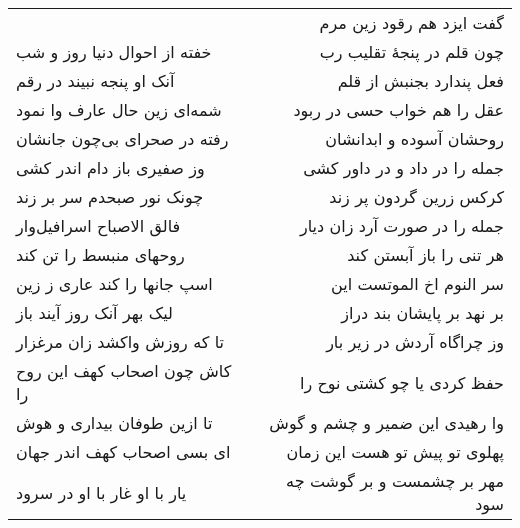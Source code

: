 \begin{center}
\begin{longtable}{l p{0.5cm} r}
&&
گفت ایزد هم رقود زین مرم
\\
خفته از احوال دنیا روز و شب
&&
چون قلم در پنجهٔ تقلیب رب
\\
آنک او پنجه نبیند در رقم
&&
فعل پندارد بجنبش از قلم
\\
شمه‌ای زین حال عارف وا نمود
&&
عقل را هم خواب حسی در ربود
\\
رفته در صحرای بی‌چون جانشان
&&
روحشان آسوده و ابدانشان
\\
وز صفیری باز دام اندر کشی
&&
جمله را در داد و در داور کشی
\\
چونک نور صبحدم سر بر زند
&&
کرکس زرین گردون پر زند
\\
فالق الاصباح اسرافیل‌وار
&&
جمله را در صورت آرد زان دیار
\\
روحهای منبسط را تن کند
&&
هر تنی را باز آبستن کند
\\
اسپ جانها را کند عاری ز زین
&&
سر النوم اخ الموتست این
\\
لیک بهر آنک روز آیند باز
&&
بر نهد بر پایشان بند دراز
\\
تا که روزش واکشد زان مرغزار
&&
وز چراگاه آردش در زیر بار
\\
کاش چون اصحاب کهف این روح را
&&
حفظ کردی یا چو کشتی نوح را
\\
تا ازین طوفان بیداری و هوش
&&
وا رهیدی این ضمیر و چشم و گوش
\\
ای بسی اصحاب کهف اندر جهان
&&
پهلوی تو پیش تو هست این زمان
\\
یار با او غار با او در سرود
&&
مهر بر چشمست و بر گوشت چه سود
\\
\end{longtable}
\end{center}
